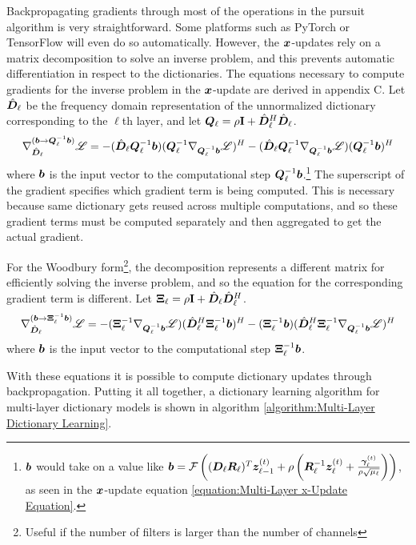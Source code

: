 Backpropagating gradients through most of the operations in the pursuit algorithm is very straightforward. Some platforms such as PyTorch \cite{paszke2017automatic} or TensorFlow \cite{tensorflow} will even do so automatically. However, the $\bm{x}$-updates rely on a matrix decomposition to solve an inverse problem, and this prevents automatic differentiation in respect to the dictionaries. The equations necessary to compute gradients for the inverse problem in the $\bm{x}$-update are derived in appendix C.
Let $\hat{\bm{D}}_{\ell}$ be the frequency domain representation of the unnormalized dictionary corresponding to the $\ell$th layer, and let $\bm{Q}_{\ell} = \rho{\bf I} + \hat{\bm{D}}_{\ell}^H\hat{\bm{D}}_{\ell}$.
\begin{equation}
\nabla_{\hat{\bm{D}}_{\ell}}^{(\bm{b} \rightarrow \bm{Q}_{\ell}^{-1}\bm{b})} \mathscr{L} = -(\hat{\bm{D}}_{\ell}\bm{Q}_{\ell}^{-1}\bm{b})(\bm{Q}_{\ell}^{-1}\nabla_{\bm{Q}_{\ell}^{-1}\bm{b}} \mathscr{L})^H - (\hat{\bm{D}}_{\ell}\bm{Q}_{\ell}^{-1}\nabla_{\bm{Q}_{\ell}^{-1}\bm{b}} \mathscr{L}) (\bm{Q}_{\ell}^{-1}\bm{b})^H
\end{equation}
where $\bm{b}$ is the input vector to the computational step $\bm{Q}_{\ell}^{-1}\bm{b}$.\footnote{$\bm{b}$ would take on a value like $\bm{b} = \mathcal{F}\left((\bm{D}_{\ell}\bm{R}_{\ell})^T\bm{z}_{\ell - 1}^{(t)} + \rho \left(\bm{R}_{\ell}^{-1}\bm{z}_{\ell}^{(t)} + \frac{\bm{\gamma}_{\ell}^{(t)}}{\rho\sqrt{\mu_{\ell}}}\right)\right) $, as seen in the $\bm{x}$-update equation \ref{equation:Multi-Layer x-Update Equation}.} The superscript of the gradient specifies which gradient term is being computed. This is necessary because same dictionary gets reused across multiple computations, and so these gradient terms must be computed separately and then aggregated to get the actual gradient.

For the Woodbury form\footnote{Useful if the number of filters is larger than the number of channels}, the decomposition represents a different matrix for efficiently solving the inverse problem, and so the equation for the corresponding gradient term is different.
Let $\bm{\Xi}_{\ell} = \rho{\bf I} + \hat{\bm{D}}_{\ell}\hat{\bm{D}}_{\ell}^H$.
\begin{equation}
\nabla_{\hat{\bm{D}}_{\ell}}^{(\bm{b} \rightarrow \bm{\Xi}_{\ell}^{-1}\bm{b})} \mathscr{L} = -(\bm{\Xi}_{\ell}^{-1}\nabla_{\bm{Q}_{\ell}^{-1}\bm{b}} \mathscr{L})(\hat{\bm{D}}_{\ell}^H\bm{\Xi}_{\ell}^{-1}\bm{b})^H -  (\bm{\Xi}_{\ell}^{-1}\bm{b})(\hat{\bm{D}}_{\ell}^H\bm{\Xi}_{\ell}^{-1}\nabla_{\bm{Q}_{\ell}^{-1}\bm{b}} \mathscr{L})^H
\end{equation}
where $\bm{b}$ is the input vector to the computational step $\bm{\Xi}_{\ell}^{-1}\bm{b}$.

With these equations it is possible to compute dictionary updates through backpropagation.  Putting it all together, a dictionary learning algorithm for multi-layer dictionary models is shown in algorithm \ref{algorithm:Multi-Layer Dictionary Learning}.

